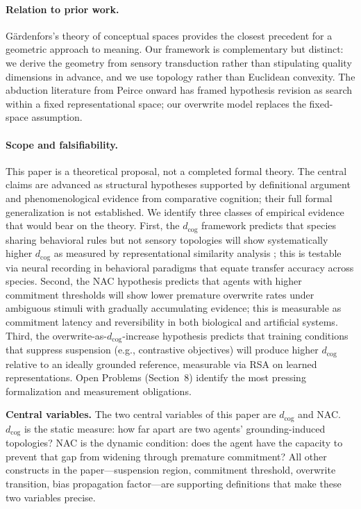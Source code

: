 \documentclass[12pt]{article}
\begin{document}
\paragraph{Relation to prior work.}
G\"{a}rdenfors's theory of conceptual spaces \cite{gardenfors2000}
provides the closest precedent for a geometric approach to meaning.
Our framework is complementary but distinct: we derive the geometry
from sensory transduction rather than stipulating quality dimensions in
advance, and we use topology rather than Euclidean convexity.
The abduction literature from Peirce onward has framed hypothesis
revision as search within a fixed representational space; our overwrite
model replaces the fixed-space assumption.

\paragraph{Scope and falsifiability.}
This paper is a theoretical proposal, not a completed formal theory.
The central claims are advanced as structural hypotheses supported by
definitional argument and phenomenological evidence from comparative
cognition; their full formal generalization is not established.
We identify three classes of empirical evidence that would bear on the
theory.
First, the $d_\mathrm{cog}$ framework predicts that species sharing
behavioral rules but not sensory topologies will show systematically
higher $d_\mathrm{cog}$ as measured by representational similarity
analysis \cite{kriegeskorte2008}; this is testable via neural recording
in behavioral paradigms that equate transfer accuracy across species.
Second, the NAC hypothesis predicts that agents with higher commitment
thresholds will show lower premature overwrite rates under ambiguous
stimuli with gradually accumulating evidence; this is measurable as
commitment latency and reversibility in both biological and artificial
systems.
Third, the overwrite-as-$d_\mathrm{cog}$-increase hypothesis predicts
that training conditions that suppress suspension (e.g., contrastive
objectives) will produce higher $d_\mathrm{cog}$ relative to an
ideally grounded reference, measurable via RSA on learned
representations.
Open Problems (Section~8) identify the most pressing formalization
and measurement obligations.

\medskip
\noindent
\textbf{Central variables.}
The two central variables of this paper are $d_\mathrm{cog}$ and NAC.
$d_\mathrm{cog}$ is the static measure: how far apart are two agents'
grounding-induced topologies?
NAC is the dynamic condition: does the agent have the capacity to
prevent that gap from widening through premature commitment?
All other constructs in the paper---suspension region, commitment
threshold, overwrite transition, bias propagation factor---are
supporting definitions that make these two variables precise.
\end{document}
